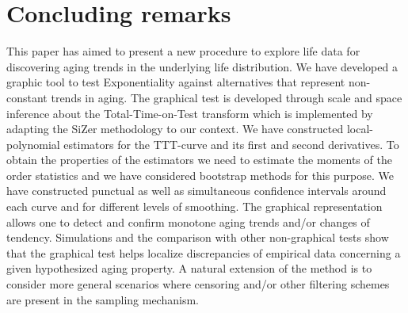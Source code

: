 \documentclass[preprint,12pt]{elsarticle}
\begin{document}
\section{Concluding remarks}
This paper has aimed to present a new procedure to explore life data for discovering aging trends in the underlying life distribution. We have developed a graphic tool to test Exponentiality against alternatives that represent non-constant trends in aging.  The graphical test is developed through scale and space inference about the Total-Time-on-Test transform which is implemented by adapting the SiZer methodology to our context.
We have constructed local-polynomial estimators for the TTT-curve and its first and second derivatives. To obtain the properties of the estimators we need to estimate the moments of the order statistics and we have considered bootstrap methods for this purpose. We have constructed punctual as well as simultaneous confidence intervals around each curve and for different levels of smoothing. The graphical representation allows one to detect and confirm monotone aging trends and/or changes of tendency.
Simulations and the comparison with other non-graphical tests show that the graphical test helps localize discrepancies of empirical data concerning a given hypothesized aging property. A natural extension of the method is to consider more general scenarios where censoring and/or other filtering schemes are present in the sampling mechanism.
\end{document}
